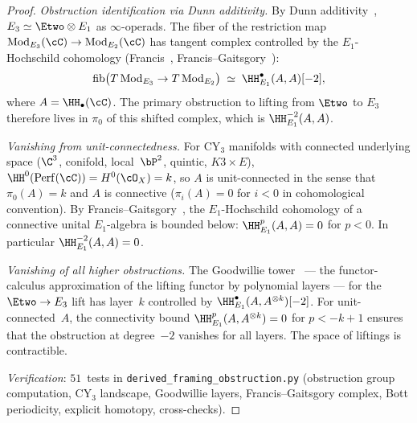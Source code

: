 \begin{proof}
\emph{Obstruction identification via Dunn additivity.}
By Dunn additivity~\cite{Dunn1988},
$E_3 \simeq \Etwo \otimes E_1$ as $\infty$-operads.  The fiber
of the restriction map
$\mathrm{Mod}_{E_3}(\cC) \to \mathrm{Mod}_{E_2}(\cC)$ has
tangent complex controlled by the $E_1$-Hochschild cohomology
(Francis~\cite{Francis2013},
Francis--Gaitsgory~\cite{FrancisGaitsgory2012}):
\[
 \mathrm{fib}\bigl(T\,\mathrm{Mod}_{E_3} \to T\,\mathrm{Mod}_{E_2}\bigr)
 \;\simeq\; \HH^\bullet_{E_1}(A, A)[-2],
\]
where $A = \HH_\bullet(\cC)$.  The primary obstruction to
lifting from $\Etwo$ to $E_3$ therefore lives in $\pi_0$ of
this shifted complex, which is $\HH^{-2}_{E_1}(A, A)$.

\smallskip\noindent\emph{Vanishing from unit-connectedness.}
For CY$_3$ manifolds with connected underlying space
($\C^3$, conifold, local~$\bP^2$, quintic, $K3 \times E$),
$\HH^0(\mathrm{Perf}(\cC)) = H^0(\cO_X) = k$, so $A$ is
unit-connected in the sense that $\pi_0(A) = k$ and $A$ is
connective ($\pi_i(A) = 0$ for $i < 0$ in cohomological
convention).  By Francis--Gaitsgory~\cite{FrancisGaitsgory2012},
the $E_1$-Hochschild cohomology of a connective unital
$E_1$-algebra is bounded below:
$\HH^p_{E_1}(A, A) = 0$ for $p < 0$.  In particular
$\HH^{-2}_{E_1}(A, A) = 0$.

\smallskip\noindent\emph{Vanishing of all higher obstructions.}
The Goodwillie tower~\cite{Goodwillie2003} --- the functor-calculus
approximation of the lifting functor by polynomial layers --- for
the $\Etwo \to E_3$ lift has layer~$k$ controlled by
$\HH^\bullet_{E_1}(A, A^{\otimes k})[-2]$.  For
unit-connected~$A$, the connectivity bound
$\HH^p_{E_1}(A, A^{\otimes k}) = 0$ for $p < -k+1$ ensures
that the obstruction at degree~$-2$ vanishes for all layers.
The space of liftings is contractible.

\noindent\textit{Verification}: $51$~tests in
\texttt{derived\_framing\_obstruction.py} (obstruction group
computation, CY$_3$ landscape, Goodwillie layers,
Francis--Gaitsgory complex, Bott periodicity, explicit homotopy,
cross-checks).
\end{proof}

